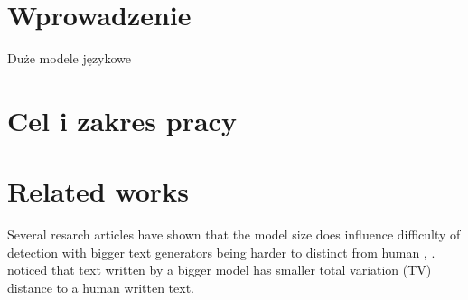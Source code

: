 \documentclass[W2, polski]{ThesisPLodz}
\let\cite\citep
\begin{document}

\chapter{Wprowadzenie} \label{ch:wstep}
Duże modele językowe 


\chapter{Cel i zakres pracy} \label{ch:celizakres}



\chapter{Related works} \label{ch:literatura}
    Several resarch articles have shown that the model
    size does influence difficulty of detection with bigger text generators being harder to distinct from human \cite{wu2025}, \cite{antoun2024}. \cite{sadasivan2023} noticed that text written by a bigger model has smaller total variation (TV) distance to a human written text.
\end{document}
